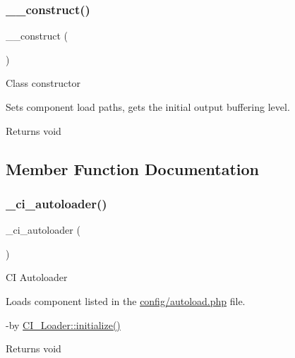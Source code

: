 \subsubsection{\texorpdfstring{\+\_\+\+\_\+construct()}{\_\_construct()}}
{\footnotesize\ttfamily \+\_\+\+\_\+construct (\begin{DoxyParamCaption}{ }\end{DoxyParamCaption})}

Class constructor

Sets component load paths, gets the initial output buffering level.

\begin{DoxyReturn}{Returns}
void 
\end{DoxyReturn}


\subsection{Member Function Documentation}
\mbox{\label{class_c_i___loader_a93471c04ea0689dcf8faa5903d201efe}} 
\subsubsection{\texorpdfstring{\+\_\+ci\+\_\+autoloader()}{\_ci\_autoloader()}}
{\footnotesize\ttfamily \+\_\+ci\+\_\+autoloader (\begin{DoxyParamCaption}{ }\end{DoxyParamCaption})\hspace{0.3cm}{\ttfamily [protected]}}

CI Autoloader

Loads component listed in the \mbox{\hyperlink{application_2config_2autoload_8php}{config/autoload.\+php}} file.

-\/by \mbox{\hyperlink{class_c_i___loader_a91098fa7d1917ce4833f284bbef12627}{C\+I\+\_\+\+Loader\+::initialize()}} \begin{DoxyReturn}{Returns}
void 
\end{DoxyReturn}
\mbox{\label{class_c_i___loader_a189d7f497e55c20fb9f82b065c20e402}} 
